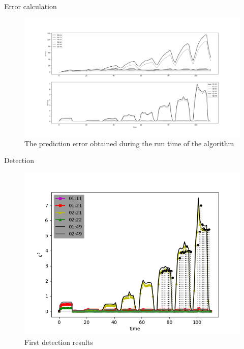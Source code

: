 \documentclass{beamer}
\begin{document}
\begin{frame}{Error calculation}
    \begin{figure}
        \includegraphics[width=1\textwidth]{meter_eleph/error_plot_sse}
        \caption{The prediction error obtained during the run time of the algorithm}
    \end{figure}
\end{frame}

\begin{frame}{Detection}
    \begin{figure}
        \includegraphics[width=.8\textwidth]{meter_eleph/detect_dumb}
        \caption{First detection results}
    \end{figure}
\end{frame}
\end{document}
